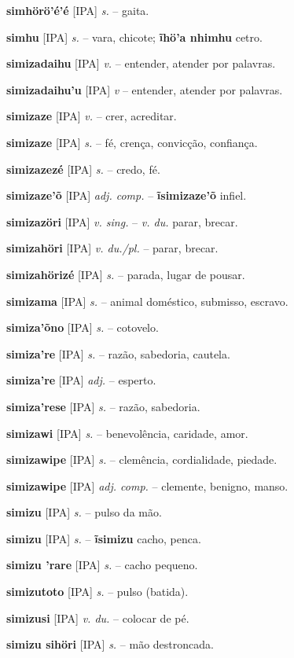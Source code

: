 \textbf{simhörö'é'é} [IPA] \textit{s.} -- gaita.

\textbf{simhu} [IPA] \textit{s.} -- vara, chicote; \textbf{ĩhö'a nhimhu} cetro.

\textbf{simizadaihu} [IPA] \textit{v.} -- entender, atender por palavras.

\textbf{simizadaihu'u} [IPA] \textit{v} -- entender, atender por palavras.

\textbf{simizaze} [IPA] \textit{v.} -- crer, acreditar.

\textbf{simizaze} [IPA] \textit{s.} -- fé, crença, convicção, confiança.

\textbf{simizazezé} [IPA] \textit{s.} -- credo, fé.

\textbf{simizaze'õ} [IPA] \textit{adj. comp.} -- \textbf{ĩsimizaze'õ} infiel.

\textbf{simizazöri} [IPA] \textit{v. sing.} -- \textit{v. du.} parar, brecar.

\textbf{simizahöri} [IPA] \textit{v. du./pl.} -- parar, brecar.

\textbf{simizahörizé} [IPA] \textit{s.} -- parada, lugar de pousar.

\textbf{simizama} [IPA] \textit{s.} -- animal doméstico, submisso, escravo.

\textbf{simiza'õno} [IPA] \textit{s.} -- cotovelo.

\textbf{simiza're} [IPA] \textit{s.} -- razão, sabedoria, cautela.

\textbf{simiza're} [IPA] \textit{adj.} -- esperto.

\textbf{simiza'rese} [IPA] \textit{s.} -- razão, sabedoria.

\textbf{simizawi} [IPA] \textit{s.} -- benevolência, caridade, amor.

\textbf{simizawipe} [IPA] \textit{s.} -- clemência, cordialidade, piedade.

\textbf{simizawipe} [IPA] \textit{adj. comp.} -- clemente, benigno, manso.

\textbf{simizu} [IPA] \textit{s.} -- pulso da mão.

\textbf{simizu} [IPA] \textit{s.} -- \textbf{ĩsimizu} cacho, penca.

\textbf{simizu 'rare} [IPA] \textit{s.} -- cacho pequeno.

\textbf{simizutoto} [IPA] \textit{s.} -- pulso (batida).

\textbf{simizusi} [IPA] \textit{v. du.} -- colocar de pé.

\textbf{simizu sihöri} [IPA] \textit{s.} -- mão destroncada.

